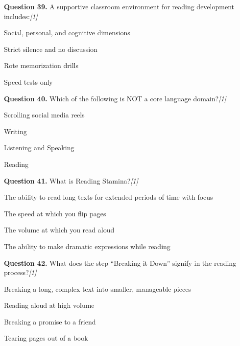 \documentclass[11pt,a4paper]{article}
\newcommand{\pts}[1]{\hfill   \textit{[#1]}}
\begin{document}
\medskip




\noindent   \textbf{Question 39.} A supportive classroom environment for reading development includes:\pts{1}

\begin{parts}
  \item Social, personal, and cognitive dimensions
  \item Strict silence and no discussion
  \item Rote memorization drills
  \item Speed tests only
\end{parts}

\medskip




\noindent   \textbf{Question 40.} Which of the following is NOT a core language domain?\pts{1}

\begin{parts}
  \item Scrolling social media reels
  \item Writing
  \item Listening and Speaking
  \item Reading
\end{parts}

\medskip




\noindent   \textbf{Question 41.} What is Reading Stamina?\pts{1}

\begin{parts}
  \item The ability to read long texts for extended periods of time with focus
  \item The speed at which you flip pages
  \item The volume at which you read aloud
  \item The ability to make dramatic expressions while reading
\end{parts}

\medskip




\noindent   \textbf{Question 42.} What does the step ``Breaking it Down'' signify in the reading process?\pts{1}

\begin{parts}
  \item Breaking a long, complex text into smaller, manageable pieces
  \item Reading aloud at high volume
  \item Breaking a promise to a friend
  \item Tearing pages out of a book
\end{parts}
\end{document}
